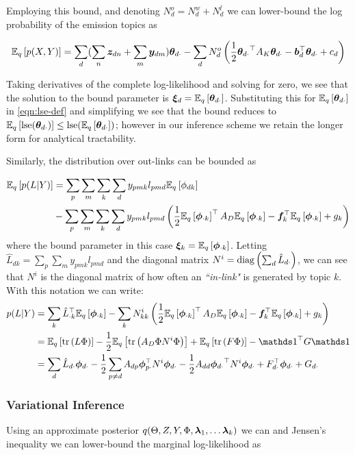 Employing this bound, and denoting $N^o_d = N^w_d + N^l_d$ we can lower-bound the log probability of the emission topics as

\begin{align}
\ex{p(X,Y)}{q} = \sum_d  (\sum_n \vv{z}_{dn} + \sum_m \vv{y}_{dm}) \thdo
   - \sum_d N^o_d \left(\half \thdo\T A_K \thdo - \vv{b}_d\T\thdo + c_d\right)
\end{align}

Taking derivatives of the complete log-likelihood and solving for zero, we see that the solution to the bound parameter is $\Ed = \ex{\thdo}{q}$. Substituting this for $\ex{\thdo}{q}$ in \eqref{eqn:lse-def} and simplifying we see that the bound reduces to $\ex{\lse(\thdo)}{q} \leq \lse(\ex{\thdo}{q})$; however in our inference scheme we retain the longer form for analytical tractability.

Similarly, the distribution over out-links can be bounded as

\begin{align}
\ex{p(L|Y)}{q} & = \sum_p \sum_m \sum_k \sum_d y_{pmk} l_{pmd} \ex{\phi_{dk}}{q} \\
 & - \sum_p \sum_m \sum_k \sum_d y_{pmk} l_{pmd} \left(\half \ex{\phok}{q}\T A_D \ex{\phok}{q} - \vv{f}_k\T \ex{\phok}{q} + g_k\right)
\end{align}
where the bound parameter in this case $\vv{\xi}_k = \ex{\phok}{q}$. Letting $\hat{L}_{dk} = \sum_p \sum_m y_{pmk} l_{pmd}$ and the diagonal matrix $N^i = \diag{\sum_d \hat{L}_{d\cdot}}$, we can see that $N^i$ is the diagonal matrix of how often an \emph{``in-link"} is generated by topic $k$. With this notation we can write:
\begin{align}
p(L|Y) & = \sum_k \hat{L}_{\cdot k}\T \ex{\phok}{q} - \sum_k N^i_{kk} \left(\half \ex{\phok}{q}\T A_D \ex{\phok}{q} - \vv{f}_k\T \ex{\phok}{q} + g_k\right) \\
& = \ex{\Tr{L \Phi}}{q} - \half \ex{\Tr{A_D \Phi N^i \Phi}}{q} + \ex{\Tr{F \Phi}}{q} - \one\T G \one \\
& = \sum_d \hat{L}_{d\cdot} \phdo - \half \sum_{p \neq d} A_{dp} \vv{\phi}_{p\cdot}\T N^i \phdo -\half A_{dd} \phdo\T N^i \phdo + F_{d\cdot}\T\phdo + G_{d\cdot}
\end{align}

\subsubsection*{Variational Inference}
Using an approximate posterior $q(\Theta, Z, Y, \Phi, \vv{\lambda}_1, \ldots \vv{\lambda}_k)$ we can and Jensen's inequality we can lower-bound the marginal log-likelihood as

